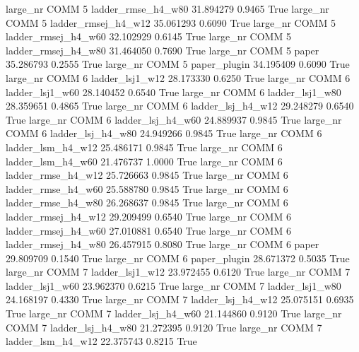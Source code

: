   large_nr     COMM                 5  ladder_rmse_h4_w80   31.894279      0.9465    True
  large_nr     COMM                 5 ladder_rmsej_h4_w12   35.061293      0.6090    True
  large_nr     COMM                 5 ladder_rmsej_h4_w60   32.102929      0.6145    True
  large_nr     COMM                 5 ladder_rmsej_h4_w80   31.464050      0.7690    True
  large_nr     COMM                 5               paper   35.286793      0.2555    True
  large_nr     COMM                 5        paper_plugin   34.195409      0.6090    True
  large_nr     COMM                 6     ladder_lsj1_w12   28.173330      0.6250    True
  large_nr     COMM                 6     ladder_lsj1_w60   28.140452      0.6540    True
  large_nr     COMM                 6     ladder_lsj1_w80   28.359651      0.4865    True
  large_nr     COMM                 6   ladder_lsj_h4_w12   29.248279      0.6540    True
  large_nr     COMM                 6   ladder_lsj_h4_w60   24.889937      0.9845    True
  large_nr     COMM                 6   ladder_lsj_h4_w80   24.949266      0.9845    True
  large_nr     COMM                 6   ladder_lsm_h4_w12   25.486171      0.9845    True
  large_nr     COMM                 6   ladder_lsm_h4_w60   21.476737      1.0000    True
  large_nr     COMM                 6  ladder_rmse_h4_w12   25.726663      0.9845    True
  large_nr     COMM                 6  ladder_rmse_h4_w60   25.588780      0.9845    True
  large_nr     COMM                 6  ladder_rmse_h4_w80   26.268637      0.9845    True
  large_nr     COMM                 6 ladder_rmsej_h4_w12   29.209499      0.6540    True
  large_nr     COMM                 6 ladder_rmsej_h4_w60   27.010881      0.6540    True
  large_nr     COMM                 6 ladder_rmsej_h4_w80   26.457915      0.8080    True
  large_nr     COMM                 6               paper   29.809709      0.1540    True
  large_nr     COMM                 6        paper_plugin   28.671372      0.5035    True
  large_nr     COMM                 7     ladder_lsj1_w12   23.972455      0.6120    True
  large_nr     COMM                 7     ladder_lsj1_w60   23.962370      0.6215    True
  large_nr     COMM                 7     ladder_lsj1_w80   24.168197      0.4330    True
  large_nr     COMM                 7   ladder_lsj_h4_w12   25.075151      0.6935    True
  large_nr     COMM                 7   ladder_lsj_h4_w60   21.144860      0.9120    True
  large_nr     COMM                 7   ladder_lsj_h4_w80   21.272395      0.9120    True
  large_nr     COMM                 7   ladder_lsm_h4_w12   22.375743      0.8215    True
